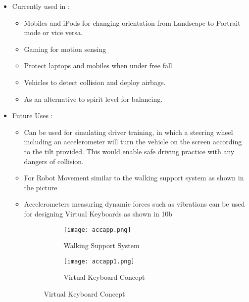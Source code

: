 \documentclass[a4paper,12 pt]{article}
\begin{document}
\begin{itemize}
\item Currently used in :
\begin{itemize}
\item Mobiles and iPods for changing orientation from Landscape to Portrait mode or vice versa.
\item Gaming for motion sensing
\item Protect laptops and mobiles when under free fall
\item Vehicles to detect collision and deploy airbags.
\item As an alternative to spirit level for balancing.
\end{itemize}
\item Future Uses :

\begin{itemize}
\item Can be used for simulating driver training, in which a steering wheel including an accelerometer will turn the vehicle on the screen according to the tilt provided. This would enable safe driving practice with any dangers of collision.
\item For Robot Movement similar to the walking support system as shown in the picture 

\item Accelerometers measuring dynamic forces such as vibrations can be used for designing Virtual Keyboards as shown in 10b
\begin{figure}[h]
        \centering
        \begin{subfigure}[b]{0.55\textwidth}
                \texttt{[image: accapp.png]}
                \caption{Walking Support System}
                \label{fig:11}
        \end{subfigure}%
        \begin{subfigure}[b]{0.40\textwidth}
                \texttt{[image: accapp1.png]}
                \caption{Virtual Keyboard Concept}
                \label{fig:12}
        \end{subfigure}%

        
\end{figure}
\end{itemize}
\end{itemize}

\pagebreak
\end{document}
